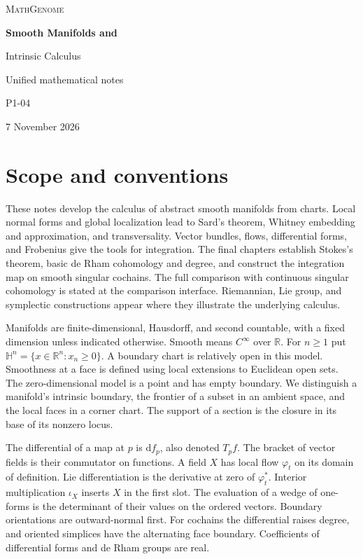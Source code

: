 \documentclass[11pt,oneside,openany]{book}
\theoremstyle{definition}
\theoremstyle{remark}
\newcommand{\R}{\mathbb R}
\newcommand{\HH}{\mathbb H}
\newcommand{\dd}{\mathrm d}
\begin{document}
\frontmatter
\hypersetup{pageanchor=false}
\begin{titlepage}
\centering
\vspace*{0.18\textheight}
{\large\scshape MathGenome\par}
\vspace{2em}
{\Huge\bfseries Smooth Manifolds and\par Intrinsic Calculus\par}
\vspace{1.6em}
{\Large Unified mathematical notes\par}
\vfill
{\large P1-04\par}
\vspace{0.5em}
{7 November 2026\par}
\end{titlepage}
\hypersetup{pageanchor=true}

\chapter*{Scope and conventions}

These notes develop the calculus of abstract smooth manifolds from charts. Local normal forms and global localization lead to Sard's theorem, Whitney embedding and approximation, and transversality. Vector bundles, flows, differential forms, and Frobenius give the tools for integration. The final chapters establish Stokes's theorem, basic de Rham cohomology and degree, and construct the integration map on smooth singular cochains. The full comparison with continuous singular cohomology is stated at the comparison interface. Riemannian, Lie group, and symplectic constructions appear where they illustrate the underlying calculus.

Manifolds are finite-dimensional, Hausdorff, and second countable, with a fixed dimension unless indicated otherwise. Smooth means \(C^\infty\) over \(\R\). For \(n\geq1\) put \(\HH^n=\{x\in\R^n:x_n\geq0\}\). A boundary chart is relatively open in this model. Smoothness at a face is defined using local extensions to Euclidean open sets. The zero-dimensional model is a point and has empty boundary. We distinguish a manifold's intrinsic boundary, the frontier of a subset in an ambient space, and the local faces in a corner chart. The support of a section is the closure in its base of its nonzero locus.

The differential of a map at \(p\) is \(\dd f_p\), also denoted \(T_pf\). The bracket of vector fields is their commutator on functions. A field \(X\) has local flow \(\varphi_t\) on its domain of definition. Lie differentiation is the derivative at zero of \(\varphi_t^*\). Interior multiplication \(\iota_X\) inserts \(X\) in the first slot. The evaluation of a wedge of one-forms is the determinant of their values on the ordered vectors. Boundary orientations are outward-normal first. For cochains the differential raises degree, and oriented simplices have the alternating face boundary. Coefficients of differential forms and de Rham groups are real.
\end{document}

